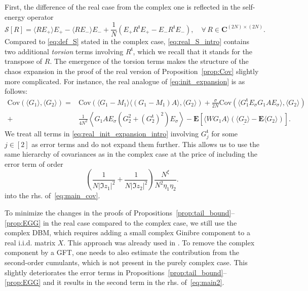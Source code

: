 \documentclass[10pt]{amsart}
\numberwithin{equation}{section}
\newcommand{\E}{\mathbf{E}}
\newcommand{\C}{\mathbf{C}}
\newcommand{\mt}{\mathfrak{t}}
\begin{document}
First, the difference of the real case from the complex one is reflected in the self-energy operator
\begin{equation}
\mathcal{S}[R]=\langle RE_+\rangle E_+ - \langle RE_-\rangle E_- +\frac{1}{N} \left( E_+R^\mt E_+ - E_-R^\mt E_-\right),\quad \forall\, R\in\C^{(2N)\times (2N)}.
\label{eq:real_S_intro}
\end{equation}
Compared to \eqref{eq:def_S} stated in the complex case, \eqref{eq:real_S_intro} contains two additional \emph{torsion} terms involving $R^\mt$, which we recall that it stands for the transpose of $R$. The emergence of the torsion terms makes the structure of the chaos expansion in the proof of the real version of Proposition~\ref{prop:Cov} slightly more complicated. For instance, the real analogue of \eqref{eq:init_expansion} is as follows:
\begin{equation}
\begin{split}
\mathrm{Cov}\left(\langle G_1\rangle,\langle G_2\rangle\right) =& \mathrm{Cov}\left(\langle G_1-M_1\rangle \langle (G_1-M_1)A\rangle, \langle G_2\rangle\right) + \frac{\sigma}{2N}\mathrm{Cov}\left(\langle G^\mathfrak{t}_1E_\sigma G_1AE_\sigma\rangle,\langle G_2\rangle\right)\\
+&\frac{1}{4N^2}\left\langle G_1AE_\sigma \left(G_2^2 + (G_2^\mathfrak{t})^2\right)E_\sigma\right\rangle - \E\left[\underline{\langle WG_1A\rangle \left(\langle G_2\rangle-\E\langle G_2\rangle\right)}\right].
\end{split}
\label{eq:real_init_expansion_intro}
\end{equation}
We treat all terms in \eqref{eq:real_init_expansion_intro} involving $G_j^\mt$ for some $j\in [2]$ as error terms and do not expand them further. This allows us to use the same hierarchy of covariances as in the complex case at the price of including the error term of order
\begin{equation*}
\left(\frac{1}{N|\Im z_1|^2}+\frac{1}{N|\Im z_2|^2}\right) \frac{N^\xi}{N^2\eta_1\eta_2}.
\end{equation*}
into the rhs. of~\eqref{eq:main_cov}.

To minimize the changes in the proofs of Propositions~\ref{prop:tail_bound}--\ref{prop:EGG} in the real case compared to the complex case, we still use the complex DBM, which requires adding a small complex Ginibre component to a real i.i.d. matrix $X$. This approach was already used in \cite[Appendix~B]{cipolloni2024maximum}. To remove the complex component by a GFT, one needs to also estimate the contribution from the second-order cumulants, which is not present in the purely complex case. This slightly deteriorates the error terms in Propositions~\ref{prop:tail_bound}--\ref{prop:EGG} and it results in the second term in the rhs. of~\eqref{eq:main2}.
\end{document}
